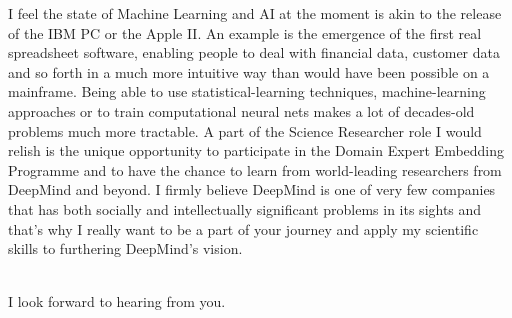 \documentclass[11pt,a4paper,sans]{moderncv}        %
\begin{document}
%
I feel the state of Machine Learning and AI at the 
moment is akin to the release of the IBM PC or the Apple II.
%
An example is the emergence of the first real spreadsheet 
software, enabling people to deal with 
financial data, customer data and so forth in a much 
more intuitive way than would have been possible on a mainframe. 
%
Being able to use statistical-learning techniques, 
machine-learning approaches or to train 
computational neural nets 
makes a lot of decades-old problems much 
more tractable.
%
A part of the Science Researcher role 
I would relish is the unique opportunity 
to participate in the Domain Expert Embedding Programme
and to have the chance to learn from world-leading researchers from 
DeepMind and beyond.
%
I firmly believe DeepMind 
is one of very 
few companies that has both socially and 
intellectually significant problems in its sights 
and that's why I really want to be a part of 
your journey and apply my scientific skills to furthering
DeepMind's vision.
% 

~\\
I look forward to hearing from you. 

~\\

\makeletterclosing

%

%
\renewcommand{\refname}{References}

\end{document}
